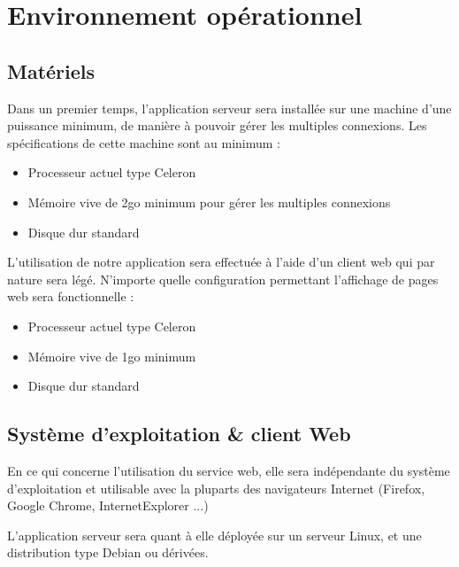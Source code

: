 	\section{Environnement opérationnel}
  \subsection{Matériels}

  Dans un premier temps, l'application serveur sera installée sur une machine d'une puissance minimum, de manière à pouvoir gérer les multiples connexions. Les spécifications de cette machine sont au minimum : \\

  \begin{itemize}
  \item Processeur actuel type Celeron
  \item Mémoire vive de 2go minimum pour gérer les multiples connexions
  \item Disque dur standard
  \end{itemize}

  \medskip

  L'utilisation de notre application sera effectuée à l'aide d'un client web qui par nature sera légé. N'importe quelle configuration permettant l'affichage de pages web sera fonctionnelle :\\

  \begin{itemize}
  \item Processeur actuel type Celeron
  \item Mémoire vive de 1go minimum
  \item Disque dur standard
  \end{itemize}

  \subsection{Système d'exploitation \& client Web}
  En ce qui concerne l'utilisation du service web, elle sera indépendante du système d'exploitation et utilisable avec la pluparts des navigateurs Internet (Firefox, Google Chrome, InternetExplorer ...) 
  
  \medskip
  
  L'application serveur sera quant à elle déployée sur un serveur Linux, et une distribution type Debian ou dérivées.

